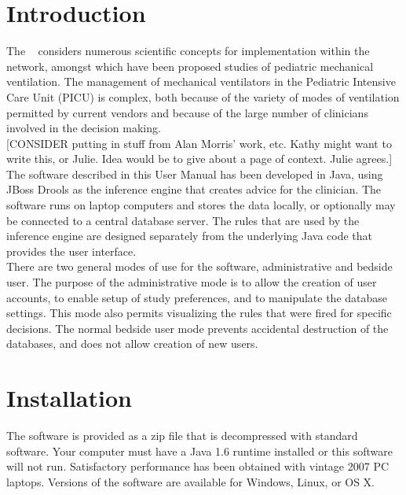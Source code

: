 
\section{Introduction}
The \abb~ considers numerous scientific concepts for implementation within the network,
amongst which have been proposed studies of pediatric mechanical ventilation.  The management
of mechanical ventilators in the Pediatric Intensive Care Unit (PICU) is complex, both because of
the variety of modes of ventilation permitted by current vendors and because of the large
number of clinicians involved in the decision making.\\

[CONSIDER putting in stuff from Alan Morris' work, etc.  Kathy might want to write this, or Julie.  Idea
would be to give about a page of context.  Julie agrees.]\\

The software described in this User Manual has been developed in Java, using JBoss Drools as the inference
engine that creates advice for the clinician.  The software runs on laptop computers and stores the data locally, or
optionally may be connected to a central database server.  The rules that are used by the inference engine are designed
separately from the underlying Java code that provides the user interface.\\

There are two general modes of use for the software, administrative and bedside user.  The purpose of the administrative
mode is to allow the creation of user accounts, to enable setup of study preferences, and to manipulate the database
settings.  This mode also permits visualizing the rules that were fired for specific decisions.  The normal bedside user
mode prevents accidental destruction of the databases, and does not allow creation of new users.\\



\section{Installation}

The software is provided as a zip file that is decompressed with standard software.  Your computer must have a Java 1.6 
runtime installed or this software will not run.  Satisfactory performance has been obtained with vintage 2007 PC laptops.
Versions of the software are available for Windows, Linux, or OS X.\\

